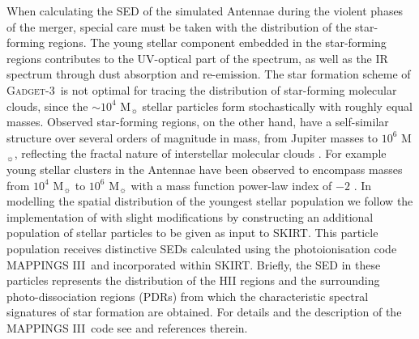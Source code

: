 \documentclass[a4paper,fleqn,usenatbib]{mnras}
\newcommand{\gadget}{\textsc{Gadget-3}}
\newcommand{\mappings}{\textsc{MAPPINGS III}}
\newcommand{\skirt}{\textsc{SKIRT}}
\begin{document}
When calculating the SED of the simulated
Antennae during the violent phases of the merger, special care must be taken 
with the distribution of the star-forming regions. The young stellar component
embedded in the star-forming regions contributes to the UV-optical part 
of the spectrum, as well as the IR spectrum through dust absorption and 
re-emission. The star formation scheme of \gadget\ is not optimal for tracing 
the distribution of star-forming molecular clouds, since the 
$\sim 10^4$ M$_{\sun}$ stellar particles form stochastically with roughly equal masses.
Observed star-forming regions, on the other hand, 
have a self-similar structure over several orders of 
magnitude in mass, from Jupiter masses to $10^6$ M$_{\sun}$, reflecting the fractal 
nature of interstellar molecular clouds
\citep{1998A&A...331L..65H, 1998A&A...336..697S, 1998A&A...329..249K}. 
For example young stellar clusters in the Antennae have been observed to 
encompass masses from $10^4$ M$_{\sun}$ to $10^6$ M$_{\sun}$ with a mass 
function power-law index of $-2$ 
\citep{1999ApJ...527L..81Z}. 
In modelling the spatial distribution of the youngest stellar population we
follow the implementation of \citet{2016MNRAS.462.1057C} \citep[see also][]{2010MNRAS.403...17J}
with slight modifications
by constructing an additional population of stellar particles to be given as input to \skirt. This particle
population receives distinctive SEDs calculated using the photoionisation code \mappings\ and incorporated 
within \skirt.
Briefly, the SED in these particles represents the distribution of the HII regions and the surrounding 
photo-dissociation regions (PDRs) from which the characteristic spectral signatures of 
star formation are obtained.  For details and the description of the \mappings\ code see
\citet{2008ApJS..176..438G} and references therein.
\end{document}
